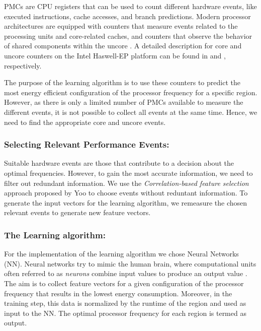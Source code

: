 PMCs are CPU registers that can be used to count different hardware events, like executed instructions, cache accesses, and branch predictions.
Modern processor architectures are equipped with counters that measure events related to the processing units and core-related caches, and counters that observe the behavior of shared components within the uncore \cite{molka:2017:a}.
A detailed description for core and uncore counters on the Intel
Haswell-EP platform can be found in \cite{Intel2018} and \cite{xeon_e5v3_Uncore}, respectively.

The purpose of the learning algorithm is to use these counters to predict the most energy efficient configuration of the processor frequency for a specific region. However, as there is only a limited number of PMCs available to measure the different events, it is not possible to collect all events at the same time. Hence, we need to find the appropriate core and uncore events.

\subsubsection{Selecting Relevant Performance Events:}

Suitable hardware events are those that contribute to a decision about the optimal frequencies.
However, to gain the most accurate information, we need to filter out redundant information. 
We use the \textit{Correlation-based feature selection} approach proposed by Yoo \cite{Yoo2012} to choose events without reduntant information. 
To generate the input vectors for the learning algorithm, we remeasure
the chosen relevant events to generate new feature vectors.

\subsubsection{The Learning algorithm:}
For the implementation of the learning algorithm we chose Neural Networks (NN). 
Neural networks try to mimic the human brain, where computational units often referred to as \textit{neurons} combine input values to produce an output value \cite{Haykin2009}.
The aim is to collect feature vectors for a given configuration of the processor frequency that results in the lowest energy consumption. Moreover, in the training step, this data is normalized by the runtime of the region and used as input to the NN. The optimal processor
frequency for each region is termed as output.

